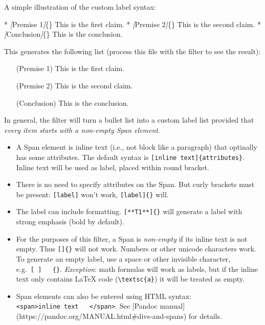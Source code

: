 \documentclass[
]{article}
\newenvironment{Shaded}{}{}
\newcommand{\CommentTok}[1]{\textcolor[rgb]{0.38,0.63,0.69}{\textit{#1}}}
\newcommand{\NormalTok}[1]{#1}
\newcommand{\OtherTok}[1]{\textcolor[rgb]{0.00,0.44,0.13}{#1}}
\newcommand{\SpecialStringTok}[1]{\textcolor[rgb]{0.73,0.40,0.53}{#1}}
\providecommand{\tightlist}{%
  \setlength{\itemsep}{0pt}\setlength{\parskip}{0pt}}
\begin{document}
A simple illustration of the custom label syntax:

\begin{Shaded}
\begin{Highlighting}[]
\SpecialStringTok{* }\CommentTok{[}\OtherTok{Premise 1}\CommentTok{]}\NormalTok{\{\} This is the first claim.}
\SpecialStringTok{* }\CommentTok{[}\OtherTok{Premise 2}\CommentTok{]}\NormalTok{\{\} This is the second claim.}
\SpecialStringTok{* }\CommentTok{[}\OtherTok{Conclusion}\CommentTok{]}\NormalTok{\{\} This is the conclusion.}
\end{Highlighting}
\end{Shaded}

This generates the following list (process this file with the filter to
see the result):

\begin{itemize}
\tightlist

\item[(Premise 1)] This is the first claim.

\item[(Premise 2)] This is the second claim.

\item[(Conclusion)] This is the conclusion.

\end{itemize}

In general, the filter will turn a bullet list into a custom label list
provided that \emph{every item starts with a non-empty Span element}.

\begin{itemize}
\tightlist
\item
  A Span element is inline text (i.e., not block like a paragraph) that
  optinally has some attributes. The default syntax is
  \texttt{{[}inline\ text{]}\{attributes\}}. Inline text will be used as
  label, placed within round bracket.
\item
  There is no need to specify attributes on the Span. But curly brackets
  must be present: \texttt{{[}label{]}} won't work,
  \texttt{{[}label{]}\{\}} will.
\item
  The label can include formatting. \texttt{{[}**T1**{]}\{\}} will
  generate a label with strong emphasis (bold by default).
\item
  For the purposes of this filter, a Span is \emph{non-empty} if its
  inline text is not empty. Thus \texttt{{[}{]}\{\}} will not work.
  Numbers or other unicode characters work. To generate an empty label,
  use a space or other invisible character,
  e.g.~\texttt{{[}\ {]}\ \ \ \{\}}. \emph{Exception}: math formulas will
  work as labels, but if the inline text only contains LaTeX code
  (\texttt{\textbackslash{}textsc\{a\}}) it will be treated as empty.
\item
  Span elements can also be entered using HTML syntax:
  \texttt{\textless{}span\textgreater{}inline\ text\ \ \ \textless{}/span\textgreater{}}.
  See {[}Pandoc manual{]}
  (https://pandoc.org/MANUAL.html\#divs-and-spans) for details.
\end{itemize}
\end{document}
